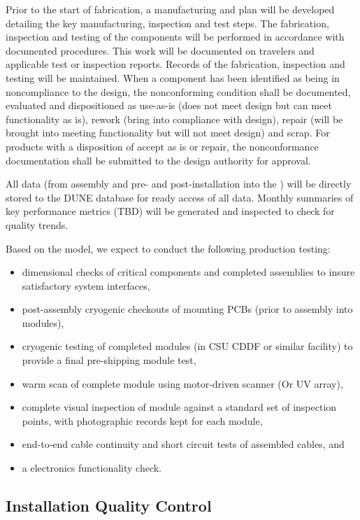 Prior to the start of fabrication, a manufacturing and  plan will be developed detailing the key manufacturing, inspection and test steps.  The fabrication, inspection and testing of the components will be performed in accordance with documented procedures. This work will be documented on travelers and applicable test or inspection reports. Records of the fabrication, inspection and testing will be maintained. When a component has been identified as being in noncompliance to the design, the nonconforming condition shall be documented, evaluated and dispositioned as use-as-is (does not meet design but can meet functionality as is), rework (bring into compliance with design), repair (will be brought into meeting functionality but will not meet design) and scrap. For products with a disposition of accept as is or repair, the nonconformance documentation shall be submitted to the design authority for approval.   

All  data  (from assembly and pre- and post-installation into the ) will be directly stored to the DUNE database for ready access of all  data.  Monthly summaries of key performance metrics (TBD) will be generated and inspected to check for quality trends.

Based on the  model, we expect to conduct the following production testing:
\begin{itemize}
\item dimensional checks of critical components and completed assemblies to insure satisfactory system interfaces,
\item post-assembly cryogenic checkouts of  mounting PCBs (prior to assembly into  modules),
\item cryogenic testing of completed modules (in CSU CDDF or similar facility) to provide a final pre-shipping module test,
\item warm scan of complete module using motor-driven  scanner (Or UV   array),
\item complete visual inspection of module against a standard set of inspection points, with photographic records kept for each module, 
\item end-to-end cable continuity and short circuit tests of assembled cables, and
\item a  electronics functionality check.
\end{itemize}

\subsection{Installation Quality Control}
\label{sec:fdsp-pd-installqc}

